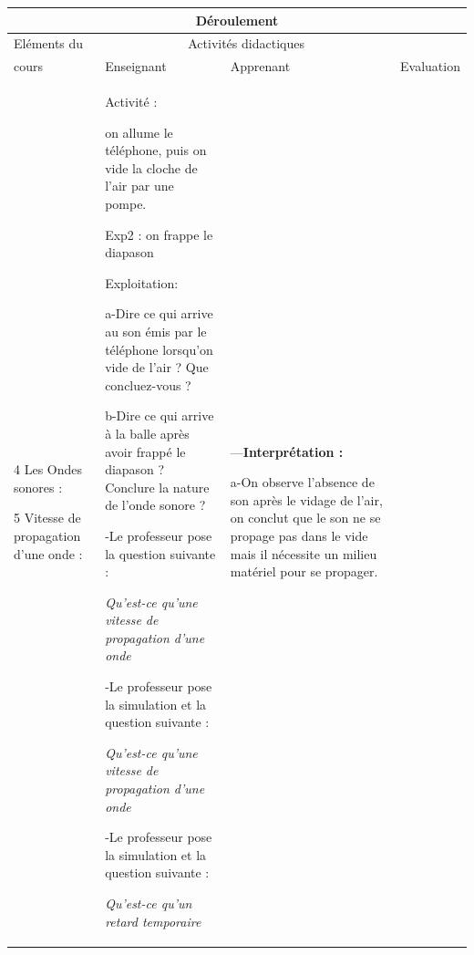 \documentclass[12pt]{article}
\begin{document}
\begin{center}
	 \begin{tabular}{|p{}||p{}||p{}||p{}|}
\hline
\multicolumn{4}{|c|}{Déroulement}\\\hline
Eléments du & \multicolumn{2}{c||}{Activités didactiques} &  \\\cline{2-3}
cours & Enseignant & Apprenant & Evaluation\\\hline

\color{red}{II Ondes longitudinales, transversales, et leurs caractéristiques.}

\vspace{0.5cm}
\color{blue}4
Les Ondes sonores :

\vspace{0.5cm}
\color{blue}5 Vitesse de propagation d’une onde :
				  &
Activité : 

on allume le téléphone, puis on vide la cloche de l’air par une pompe.

Exp2 : on frappe le diapason 
\vspace{0.2cm}

Exploitation: 

a-Dire ce qui arrive au son émis par le
téléphone lorsqu’on vide de l’air ? Que
concluez-vous ?

b-Dire ce qui arrive à la balle après avoir frappé
le diapason ? Conclure la nature de l’onde
sonore ?
\vspace{0.5cm}

-Le professeur pose la question suivante : 

\emph{Qu’est-ce qu’une vitesse de propagation d’une onde}
\vspace{0.2cm}

-Le professeur pose la simulation et la  question suivante : 

\emph{Qu’est-ce qu’une vitesse de propagation d’une onde}
\vspace{0.2cm}

-Le professeur pose la simulation et la  question suivante : 

\emph{Qu'est-ce qu'un retard temporaire}





				  &

---\textbf{Interprétation : }

a-On observe l’absence de son après le vidage de
l’air, on conclut que le son ne se
propage pas dans le vide mais il nécessite un milieu
matériel pour se propager.
\vspace{0.2cm}


\end{tabular}
\end{center}
\end{document}
